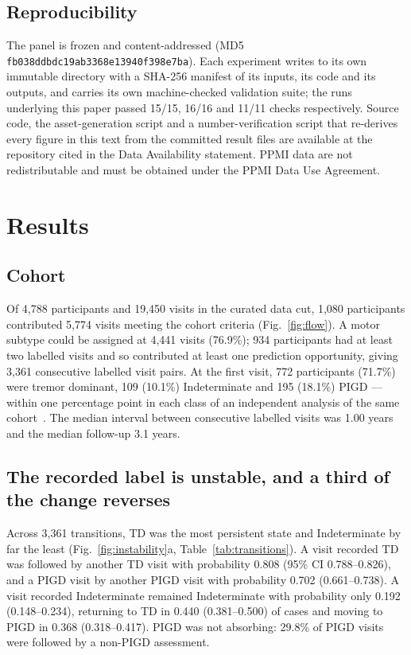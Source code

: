 \documentclass[journal]{IEEEtran}
\begin{document}
\subsection{Reproducibility}
The panel is frozen and content-addressed (MD5
\texttt{fb038ddbdc19ab3368e13940f398e7ba}). Each experiment writes to its own
immutable directory with a SHA-256 manifest of its inputs, its code and its
outputs, and carries its own machine-checked validation suite; the runs
underlying this paper passed 15/15, 16/16 and 11/11 checks respectively. Source
code, the asset-generation script and a number-verification script that
re-derives every figure in this text from the committed result files are
available at the repository cited in the Data Availability statement. PPMI data
are not redistributable and must be obtained under the PPMI Data Use Agreement.

\section{Results}

\subsection{Cohort}
Of 4,788 participants and 19,450 visits in the curated data cut, 1,080
participants contributed 5,774 visits meeting the cohort criteria
(Fig.~\ref{fig:flow}). A motor subtype could be assigned at 4,441 visits
(76.9\%); 934 participants had at least two labelled visits and so contributed
at least one prediction opportunity, giving 3,361 consecutive labelled visit
pairs. At the first visit, 772 participants (71.7\%) were tremor dominant, 109
(10.1\%) Indeterminate and 195 (18.1\%) PIGD --- within one percentage point in
each class of an independent analysis of the same cohort~\cite{simuni2016}. The
median interval between consecutive labelled visits was 1.00 years and the
median follow-up 3.1 years.

\subsection{The recorded label is unstable, and a third of the change reverses}

Across 3,361 transitions, TD was the most persistent state and Indeterminate by
far the least (Fig.~\ref{fig:instability}a, Table~\ref{tab:transitions}). A
visit recorded TD was followed by another TD visit with probability 0.808 (95\%
CI 0.788--0.826), and a PIGD visit by another PIGD visit with probability 0.702
(0.661--0.738). A visit recorded Indeterminate remained Indeterminate with
probability only 0.192 (0.148--0.234), returning to TD in 0.440 (0.381--0.500)
of cases and moving to PIGD in 0.368 (0.318--0.417). PIGD was not absorbing:
29.8\% of PIGD visits were followed by a non-PIGD assessment.
\end{document}
